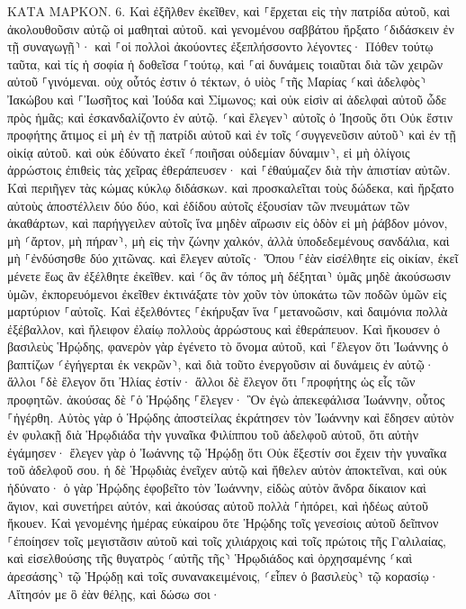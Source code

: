 \documentclass[twoside, 9pt]{extreport}
\begin{document}
ΚΑΤΑ ΜΑΡΚΟΝ.
6.
Καὶ ἐξῆλθεν ἐκεῖθεν, καὶ ⸀ἔρχεται εἰς τὴν πατρίδα αὐτοῦ, καὶ ἀκολουθοῦσιν αὐτῷ οἱ μαθηταὶ αὐτοῦ. 
καὶ γενομένου σαββάτου ἤρξατο ⸂διδάσκειν ἐν τῇ συναγωγῇ⸃· καὶ ⸀οἱ πολλοὶ ἀκούοντες ἐξεπλήσσοντο λέγοντες· Πόθεν τούτῳ ταῦτα, καὶ τίς ἡ σοφία ἡ δοθεῖσα ⸀τούτῳ, καὶ ⸀αἱ δυνάμεις τοιαῦται διὰ τῶν χειρῶν αὐτοῦ ⸀γινόμεναι. 
οὐχ οὗτός ἐστιν ὁ τέκτων, ὁ υἱὸς ⸀τῆς Μαρίας ⸂καὶ ἀδελφὸς⸃ Ἰακώβου καὶ ⸀Ἰωσῆτος καὶ Ἰούδα καὶ Σίμωνος; καὶ οὐκ εἰσὶν αἱ ἀδελφαὶ αὐτοῦ ὧδε πρὸς ἡμᾶς; καὶ ἐσκανδαλίζοντο ἐν αὐτῷ. 
⸂καὶ ἔλεγεν⸃ αὐτοῖς ὁ Ἰησοῦς ὅτι Οὐκ ἔστιν προφήτης ἄτιμος εἰ μὴ ἐν τῇ πατρίδι αὐτοῦ καὶ ἐν τοῖς ⸂συγγενεῦσιν αὐτοῦ⸃ καὶ ἐν τῇ οἰκίᾳ αὐτοῦ. 
καὶ οὐκ ἐδύνατο ἐκεῖ ⸂ποιῆσαι οὐδεμίαν δύναμιν⸃, εἰ μὴ ὀλίγοις ἀρρώστοις ἐπιθεὶς τὰς χεῖρας ἐθεράπευσεν· 
καὶ ⸀ἐθαύμαζεν διὰ τὴν ἀπιστίαν αὐτῶν. Καὶ περιῆγεν τὰς κώμας κύκλῳ διδάσκων. 
καὶ προσκαλεῖται τοὺς δώδεκα, καὶ ἤρξατο αὐτοὺς ἀποστέλλειν δύο δύο, καὶ ἐδίδου αὐτοῖς ἐξουσίαν τῶν πνευμάτων τῶν ἀκαθάρτων, 
καὶ παρήγγειλεν αὐτοῖς ἵνα μηδὲν αἴρωσιν εἰς ὁδὸν εἰ μὴ ῥάβδον μόνον, μὴ ⸂ἄρτον, μὴ πήραν⸃, μὴ εἰς τὴν ζώνην χαλκόν, 
ἀλλὰ ὑποδεδεμένους σανδάλια, καὶ μὴ ⸀ἐνδύσησθε δύο χιτῶνας. 
καὶ ἔλεγεν αὐτοῖς· Ὅπου ⸀ἐὰν εἰσέλθητε εἰς οἰκίαν, ἐκεῖ μένετε ἕως ἂν ἐξέλθητε ἐκεῖθεν. 
καὶ ⸂ὃς ἂν τόπος μὴ δέξηται⸃ ὑμᾶς μηδὲ ἀκούσωσιν ὑμῶν, ἐκπορευόμενοι ἐκεῖθεν ἐκτινάξατε τὸν χοῦν τὸν ὑποκάτω τῶν ποδῶν ὑμῶν εἰς μαρτύριον ⸀αὐτοῖς. 
Καὶ ἐξελθόντες ⸀ἐκήρυξαν ἵνα ⸀μετανοῶσιν, 
καὶ δαιμόνια πολλὰ ἐξέβαλλον, καὶ ἤλειφον ἐλαίῳ πολλοὺς ἀρρώστους καὶ ἐθεράπευον. 
Καὶ ἤκουσεν ὁ βασιλεὺς Ἡρῴδης, φανερὸν γὰρ ἐγένετο τὸ ὄνομα αὐτοῦ, καὶ ⸀ἔλεγον ὅτι Ἰωάννης ὁ βαπτίζων ⸂ἐγήγερται ἐκ νεκρῶν⸃, καὶ διὰ τοῦτο ἐνεργοῦσιν αἱ δυνάμεις ἐν αὐτῷ· 
ἄλλοι ⸀δὲ ἔλεγον ὅτι Ἠλίας ἐστίν· ἄλλοι δὲ ἔλεγον ὅτι ⸀προφήτης ὡς εἷς τῶν προφητῶν. 
ἀκούσας δὲ ⸀ὁ Ἡρῴδης ⸀ἔλεγεν· Ὃν ἐγὼ ἀπεκεφάλισα Ἰωάννην, οὗτος ⸀ἠγέρθη. 
Αὐτὸς γὰρ ὁ Ἡρῴδης ἀποστείλας ἐκράτησεν τὸν Ἰωάννην καὶ ἔδησεν αὐτὸν ἐν φυλακῇ διὰ Ἡρῳδιάδα τὴν γυναῖκα Φιλίππου τοῦ ἀδελφοῦ αὐτοῦ, ὅτι αὐτὴν ἐγάμησεν· 
ἔλεγεν γὰρ ὁ Ἰωάννης τῷ Ἡρῴδῃ ὅτι Οὐκ ἔξεστίν σοι ἔχειν τὴν γυναῖκα τοῦ ἀδελφοῦ σου. 
ἡ δὲ Ἡρῳδιὰς ἐνεῖχεν αὐτῷ καὶ ἤθελεν αὐτὸν ἀποκτεῖναι, καὶ οὐκ ἠδύνατο· 
ὁ γὰρ Ἡρῴδης ἐφοβεῖτο τὸν Ἰωάννην, εἰδὼς αὐτὸν ἄνδρα δίκαιον καὶ ἅγιον, καὶ συνετήρει αὐτόν, καὶ ἀκούσας αὐτοῦ πολλὰ ⸀ἠπόρει, καὶ ἡδέως αὐτοῦ ἤκουεν. 
Καὶ γενομένης ἡμέρας εὐκαίρου ὅτε Ἡρῴδης τοῖς γενεσίοις αὐτοῦ δεῖπνον ⸀ἐποίησεν τοῖς μεγιστᾶσιν αὐτοῦ καὶ τοῖς χιλιάρχοις καὶ τοῖς πρώτοις τῆς Γαλιλαίας, 
καὶ εἰσελθούσης τῆς θυγατρὸς ⸂αὐτῆς τῆς⸃ Ἡρῳδιάδος καὶ ὀρχησαμένης ⸂καὶ ἀρεσάσης⸃ τῷ Ἡρῴδῃ καὶ τοῖς συνανακειμένοις, ⸂εἶπεν ὁ βασιλεὺς⸃ τῷ κορασίῳ· Αἴτησόν με ὃ ἐὰν θέλῃς, καὶ δώσω σοι· 
\end{document}
